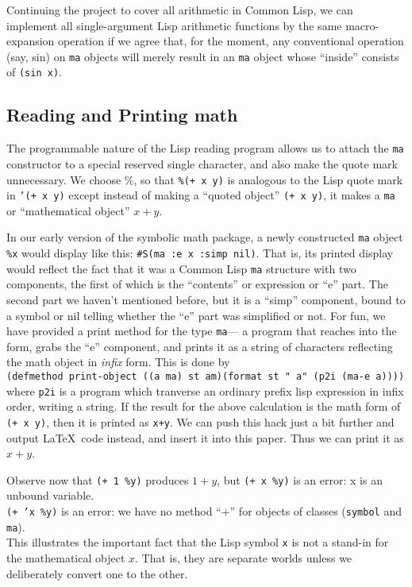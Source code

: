\documentclass{article}
\begin{document}
{{{Continuing the project to cover all arithmetic in Common Lisp, we
can implement all single-argument Lisp arithmetic functions by the same
macro-expansion operation if we agree that, for the moment, any
conventional operation (say, sin) on {\tt ma} objects will merely
result in an {\tt ma} object whose ``inside'' consists of {\tt (sin
x)}. }}

\subsection{Reading and Printing math}

{The programmable nature of the Lisp reading program
allows us to attach the {\tt ma} constructor to a special reserved single
character, and also make the quote mark unnecessary.  
We choose \%, so
that {\tt \%(+ x y)} is analogous to the Lisp quote mark in {\tt '(+ x
y)} except instead of making a ``quoted object'' {\tt (+ x y)}, it
makes a {\tt ma} or ``mathematical object'' $x+y$.}

In our early version of the symbolic math package, a newly constructed
{\tt ma} object {\tt \%x} would display like this:
\verb|#S(ma :e x :simp nil)|.  That is, its printed display would
reflect the fact that it was a Common Lisp {\tt ma} structure with two
components, the first of which is
the ``contents'' or expression or ``e'' part. 
The second part we haven't mentioned before, but it is a ``simp'' component,
bound to a symbol or nil telling whether the ``e'' part
was simplified or not.  For fun, we have provided a
print method for the type {\tt ma}--- a program that reaches into the form,
grabs the ``e'' component, and prints it as a string of characters
reflecting the math object in {\em infix} form. This is done by\\ 
{\tt(defmethod print-object ((a ma) st am)(format st "~a" (p2i (ma-e a))))\\ } 
where {\tt p2i} is a program which tranverse an ordinary prefix lisp expression
in infix order, writing a string. 
If the result for the above calculation is the math form
of {\tt (+ x y)},
then it is printed as {\tt x+y}. We can push this hack just a bit
further and output \LaTeX\ code instead, and insert it into this
paper.  Thus we can print it as $x+y$.

Observe now that {\tt (+ 1 \%y)} produces $1+y$, but 
 {\tt (+ x \%y)} is an error:  x is an unbound variable.\\
 {\tt (+ 'x \%y)} is an error:  we have no method ``+'' for objects of classes
({\tt symbol} and {\tt ma}).\\
This illustrates the important fact that the Lisp symbol {\tt x} is 
not a stand-in for the mathematical object $x$.  That is, they are
separate worlds unless we deliberately convert one to the other.

}
\end{document}
